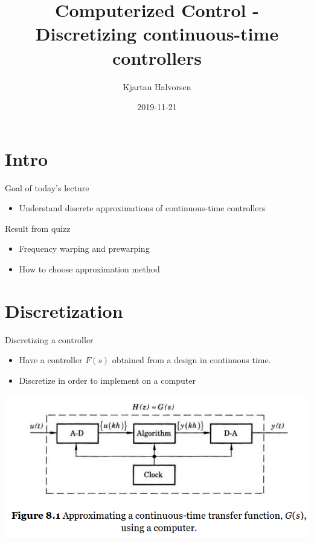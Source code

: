 \documentclass[presentation,aspectratio=1610]{beamer}
\author{Kjartan Halvorsen}
\date{2019-11-21}
\title{Computerized Control - Discretizing continuous-time controllers}
\begin{document}
\maketitle



\section{Intro}
\label{sec-1}

\begin{frame}[label=sec-1-1]{Goal of today's lecture}
\begin{itemize}
\item Understand discrete approximations of continuous-time controllers
\end{itemize}
\end{frame}

\begin{frame}[label=sec-1-2]{Result from quizz}
\begin{itemize}
\item Frequency warping and prewarping
\item How to choose approximation method
\end{itemize}
\end{frame}

\section{Discretization}
\label{sec-2}
\begin{frame}[label=sec-2-1]{Discretizing a controller}
\begin{itemize}
\item Have a controller \(F(s)\) obtained from a design in continuous time.
\item Discretize in order to implement on a computer
\end{itemize}

\begin{center}
\includegraphics[width=0.7\linewidth]{../../figures/fig8-1.png}
\end{center}
\end{frame}
\end{document}
